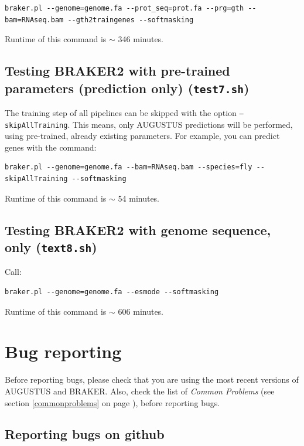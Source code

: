 \documentclass[a4paper,10pt]{report}
\begin{document}
\begin{verbatim}
braker.pl --genome=genome.fa --prot_seq=prot.fa --prg=gth --bam=RNAseq.bam --gth2traingenes --softmasking
\end{verbatim}

Runtime of this command is $\sim$ 346 minutes.

\section{Testing BRAKER2 with pre-trained parameters (prediction only) (\texttt{test7.sh})}

The training step of all pipelines can be skipped with the option \texttt{--skipAllTraining}. This means, only AUGUSTUS predictions will be performed, using pre-trained, already existing parameters. For example, you can predict genes with the command:

\begin{verbatim}
braker.pl --genome=genome.fa --bam=RNAseq.bam --species=fly --skipAllTraining --softmasking
\end{verbatim}

Runtime of this command is $\sim$ 54 minutes.

\section{Testing BRAKER2 with genome sequence, only (\texttt{text8.sh})}

Call:

\begin{verbatim}
braker.pl --genome=genome.fa --esmode --softmasking
\end{verbatim}

Runtime of this command is $\sim$ 606 minutes.

\chapter{Bug reporting}

Before reporting bugs, please check that you are using the most recent versions of AUGUSTUS and BRAKER. Also, check the list of \textit{Common Problems} (see section \ref{commonproblems} on page \pageref{commonproblems}), before reporting bugs.

\section{Reporting bugs on github}
\end{document}
